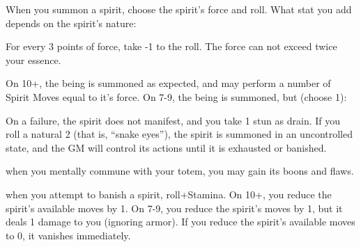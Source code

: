 \begin{dossier}
\hspace{.5cm}%
\vrule width 2pt
\hspace{.3cm}%
\begin{dossiermovebar}
\fontsize{9pt}{1em}\selectfont
\setlength{\parskip}{.1cm}

 When you summon a spirit, choose the spirit's force and roll. What stat you add
depends on the spirit’s nature:
\begin{moveoptions}




\end{moveoptions}

For every 3 points of force, take -1 to the
roll. The force can not exceed twice your essence.

On 10+, the being is summoned as expected, and may perform a number of Spirit Moves
equal to it's force. On 7-9, the being is summoned, but (choose 1):
\begin{moveoptions}


\end{moveoptions}
On a failure, the spirit does not manifest, and
you take 1 stun as drain. If you roll a natural 2
(that is, “snake eyes”), the spirit is summoned in an uncontrolled state, and the GM will control
its actions until it is exhausted or banished.

 when you mentally commune with your totem, you may gain its boons and
flaws.

 when you attempt to banish a spirit, roll+Stamina. On 10+, you reduce the spirit’s
available moves by 1. On 7-9, you reduce the spirit’s moves by 1, but it deals 1 damage to
you (ignoring armor). If you reduce the spirit’s available moves to 0, it vanishes immediately.


\end{dossiermovebar}
\end{dossier}
